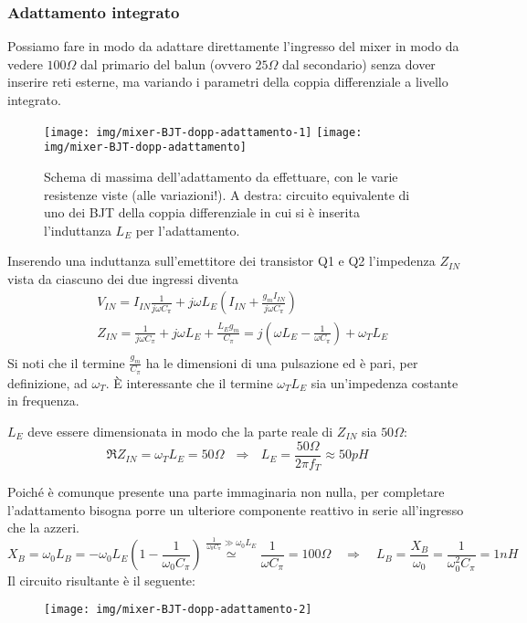 \subsubsection{Adattamento integrato}
Possiamo fare in modo da adattare direttamente l'ingresso del mixer in modo da vedere $100\Omega$ dal primario del balun (ovvero $25\Omega$ dal secondario) senza dover inserire reti esterne, ma variando i parametri della coppia differenziale a livello integrato. 

\begin{figure}[tbh]
\texttt{[image: img/mixer-BJT-dopp-adattamento-1]}
\hspace{\fill}
\texttt{[image: img/mixer-BJT-dopp-adattamento]}
\caption{Schema di massima dell'adattamento da effettuare, con le varie resistenze viste (alle variazioni!). A destra: circuito equivalente di uno dei BJT della coppia differenziale in cui si è inserita l'induttanza $L_E$ per l'adattamento.}
\label{fig:mixer-bjt-dopp-adattamento}
\end{figure}

Inserendo una induttanza sull'emettitore dei transistor Q1 e Q2 l'impedenza $Z_{IN}$ vista da ciascuno dei due ingressi diventa
\begin{align*}
&V_{IN} = I_{IN} \frac{1}{j\omega C_{\pi}} + j\omega L_E \left( I_{IN} + \frac{g_m I_{IN}}{j \omega C_\pi} \right)
\\
&Z_{IN} = \frac{1}{j\omega C_{\pi}} + j\omega L_E + \frac{L_E g_m}{C_\pi} = j \left( \omega L_E - \frac{1}{\omega C_\pi} \right) + \omega_T L_E
\\	
\end{align*}
Si noti che il termine $\frac{g_m}{C_\pi}$ ha le dimensioni di una pulsazione ed è pari, per definizione, ad $\omega_T$. È interessante che il termine $\omega_T L_E$ sia un'impedenza costante in frequenza.

$L_E$ deve essere dimensionata in modo che la parte reale di $Z_{IN}$ sia $50 \Omega$:
\[
\Re{Z_{IN}} = \omega_T L_E = 50\Omega ~~~ \Rightarrow ~~~ L_E = \frac{50 \Omega}{2\pi f_T} \approx 50pH
\]

Poiché è comunque presente una parte immaginaria non nulla, per completare l'adattamento bisogna porre un ulteriore componente reattivo in serie all'ingresso che la azzeri.
\[
X_B = \omega_0 L_B = - \omega_0 L_E \left( 1 - \frac{1}{\omega_0 C_\pi} \right) \overset{\frac{1}{\omega_0C_\pi}\gg\omega_0L_E}{\simeq} \frac{1}{\omega C_\pi} = 100\Omega
\quad \Rightarrow \quad
L_B = \frac{X_B}{\omega_0} = \frac{1}{\omega_0^2 C_\pi}= 1nH
\]
Il circuito risultante è il seguente:
\begin{figure}[tbh]
\centering
\texttt{[image: img/mixer-BJT-dopp-adattamento-2]}
\caption{}
\label{fig:mixer-bjt-dopp-adattamento-completo}
\end{figure}

